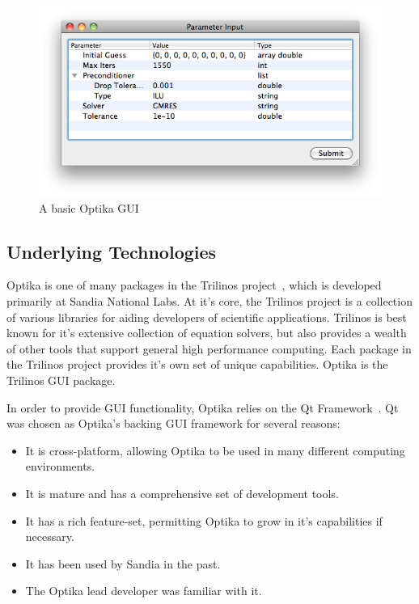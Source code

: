 \begin{figure}
\centering
\includegraphics[scale=0.5]{graphics/basic_example}
\caption[Basic GUI]{A basic Optika GUI}
\label{basicexample}
\end{figure} 

\subsection{Underlying Technologies}
Optika is one of many packages in the Trilinos project~\cite{trilinos}, which is developed primarily at Sandia National Labs. At it's core, 
the Trilinos project is a collection of various
libraries for aiding developers of scientific applications. Trilinos is best known for it's extensive collection of equation solvers,
but also provides a wealth of other tools that support general high performance computing. Each package in the Trilinos project provides
it's own set of unique capabilities. Optika is the Trilinos GUI package.

In order to provide GUI functionality, Optika relies on the Qt Framework~\cite{Qt}. 
Qt was chosen as Optika's backing GUI framework for several reasons:
	\begin{itemize}
		\item It is cross-platform, allowing Optika to be used in many different computing environments.
		\item It is mature and has a comprehensive set of development tools. 
		\item It has a rich feature-set, permitting Optika to grow in it's capabilities if necessary.
		\item It has been used by Sandia in the past.
		\item The Optika lead developer was familiar with it.
	\end{itemize}

